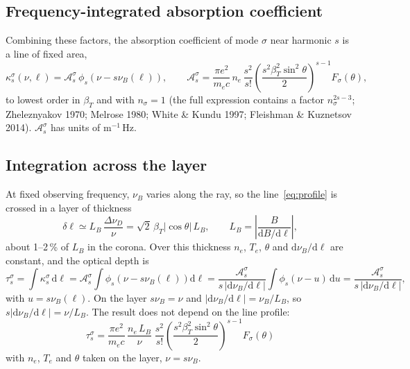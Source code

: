 \documentclass[11pt,a4paper]{article}
\newcommand{\dd}{\mathrm{d}}
\newcommand{\nuB}{\nu_B}
\begin{document}
\subsection{Frequency-integrated absorption coefficient}
Combining these factors, the absorption coefficient of mode $\sigma$ near harmonic $s$ is a
line of fixed area,
\begin{equation}
  \kappa_s^\sigma(\nu,\ell)=\mathcal A_s^\sigma\,\phi_s\!\left(\nu-s\nuB(\ell)\right),\qquad
  \mathcal A_s^\sigma=\frac{\pi e^2}{m_ec}\,n_e\,\frac{s^2}{s!}
     \left(\frac{s^2\beta_T^2\sin^2\theta}{2}\right)^{s-1}F_\sigma(\theta),
  \label{eq:area}
\end{equation}
to lowest order in $\beta_T$ and with $n_\sigma=1$ (the full expression contains a factor
$n_\sigma^{2s-3}$; Zheleznyakov 1970; Melrose 1980; White \& Kundu 1997; Fleishman \& Kuznetsov
2014). $\mathcal A_s^\sigma$ has units of m$^{-1}$\,Hz.

\subsection{Integration across the layer}
At fixed observing frequency, $\nuB$ varies along the ray, so the line~\eqref{eq:profile} is
crossed in a layer of thickness
\begin{equation}
  \delta\ell\simeq L_B\,\frac{\Delta\nu_D}{\nu}=\sqrt2\,\beta_T|\cos\theta|\,L_B,
  \qquad L_B=\left|\frac{B}{\dd B/\dd\ell}\right|,
\end{equation}
about 1--2\,\% of $L_B$ in the corona. Over this thickness $n_e$, $T_e$, $\theta$ and
$\dd\nuB/\dd\ell$ are constant, and the optical depth is
\begin{equation}
  \tau_s^\sigma=\int\kappa_s^\sigma\,\dd\ell
  =\mathcal A_s^\sigma\int\phi_s\!\left(\nu-s\nuB(\ell)\right)\dd\ell
  =\frac{\mathcal A_s^\sigma}{s\,|\dd\nuB/\dd\ell|}\int\phi_s(\nu-u)\,\dd u
  =\frac{\mathcal A_s^\sigma}{s\,|\dd\nuB/\dd\ell|},
\end{equation}
with $u=s\nuB(\ell)$. On the layer $s\nuB=\nu$ and $|\dd\nuB/\dd\ell|=\nuB/L_B$, so
$s|\dd\nuB/\dd\ell|=\nu/L_B$. The result does not depend on the line profile:
\begin{equation}
  \boxed{\;
  \tau_s^\sigma=\frac{\pi e^2}{m_ec}\,\frac{n_e\,L_B}{\nu}\;\frac{s^2}{s!}
   \left(\frac{s^2\beta_T^2\sin^2\theta}{2}\right)^{s-1}F_\sigma(\theta)\;}
  \label{eq:tau}
\end{equation}
with $n_e$, $T_e$ and $\theta$ taken on the layer, $\nu=s\nuB$.
\end{document}
